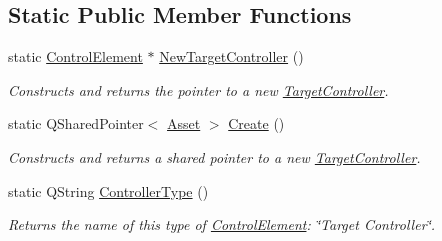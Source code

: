 \subsection*{Static Public Member Functions}
\begin{DoxyCompactItemize}
\item 
\hypertarget{class_picto_1_1_target_controller_adac36d78ba82593ebe3f42d4ed59365b}{static \hyperlink{class_picto_1_1_control_element}{Control\-Element} $\ast$ \hyperlink{class_picto_1_1_target_controller_adac36d78ba82593ebe3f42d4ed59365b}{New\-Target\-Controller} ()}\label{class_picto_1_1_target_controller_adac36d78ba82593ebe3f42d4ed59365b}

\begin{DoxyCompactList}\small\item\em Constructs and returns the pointer to a new \hyperlink{class_picto_1_1_target_controller}{Target\-Controller}. \end{DoxyCompactList}\item 
\hypertarget{class_picto_1_1_target_controller_a6083e55822171a0e57d12fcef29fe035}{static Q\-Shared\-Pointer$<$ \hyperlink{class_picto_1_1_asset}{Asset} $>$ \hyperlink{class_picto_1_1_target_controller_a6083e55822171a0e57d12fcef29fe035}{Create} ()}\label{class_picto_1_1_target_controller_a6083e55822171a0e57d12fcef29fe035}

\begin{DoxyCompactList}\small\item\em Constructs and returns a shared pointer to a new \hyperlink{class_picto_1_1_target_controller}{Target\-Controller}. \end{DoxyCompactList}\item 
\hypertarget{class_picto_1_1_target_controller_aaf4a0d262eb231377fe60d83d9eadffb}{static Q\-String \hyperlink{class_picto_1_1_target_controller_aaf4a0d262eb231377fe60d83d9eadffb}{Controller\-Type} ()}\label{class_picto_1_1_target_controller_aaf4a0d262eb231377fe60d83d9eadffb}

\begin{DoxyCompactList}\small\item\em Returns the name of this type of \hyperlink{class_picto_1_1_control_element}{Control\-Element}\-: \char`\"{}\-Target Controller\char`\"{}. \end{DoxyCompactList}\end{DoxyCompactItemize}
